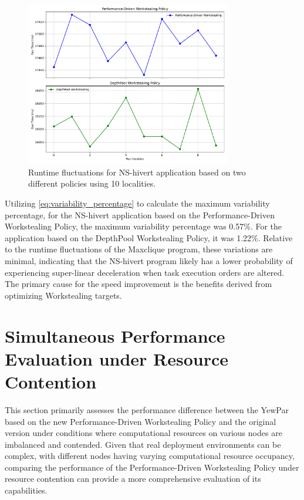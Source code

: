 \documentclass{mproj}
\begin{document}
\begin{figure}[h]
    \centering
    \includegraphics[width=0.8\textwidth]{images/NS_hivert_fluctuations.pdf}
    \caption{Runtime fluctuations for NS-hivert application based on two different policies using 10 localities.}
    \label{fig:NS_hivert_fluctuations}
\end{figure}
\FloatBarrier

Utilizing \cref{eq:variability_percentage} to calculate the maximum variability percentage,
for the NS-hivert application based on the Performance-Driven Workstealing Policy,
the maximum variability percentage was 0.57\%.
For the application based on the DepthPool Workstealing Policy, it was 1.22\%.
Relative to the runtime fluctuations of the Maxclique program, these variations are minimal,
indicating that the NS-hivert program likely has a lower probability of experiencing super-linear deceleration when task execution orders are altered.
The primary cause for the speed improvement is the benefits derived from optimizing Workstealing targets.

\section{Simultaneous Performance Evaluation under Resource Contention}

This section primarily assesses the performance difference between the YewPar based on the new Performance-Driven Workstealing Policy and the original version under conditions where computational resources on various nodes are imbalanced and contended.
Given that real deployment environments can be complex, with different nodes having varying computational resource occupancy,
comparing the performance of the Performance-Driven Workstealing Policy under resource contention can provide a more comprehensive evaluation of its capabilities.
\end{document}
